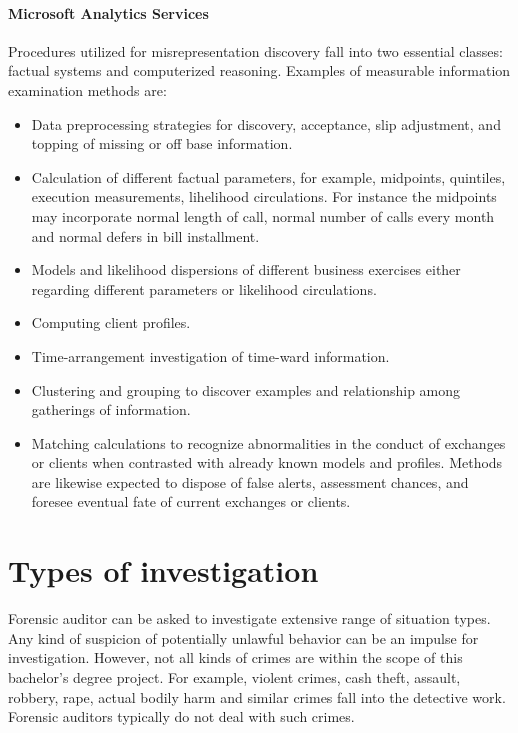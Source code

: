 {\paragraph{Microsoft Analytics Services}
Procedures utilized for misrepresentation discovery fall into two essential classes: factual systems and computerized reasoning. Examples of measurable information examination methods are: 

\begin{itemize}
\item Data preprocessing strategies for discovery, acceptance, slip adjustment, and topping of missing or off base information.
\item Calculation of different factual parameters, for example, midpoints, quintiles, execution measurements, lihelihood circulations. For instance the midpoints may incorporate normal length of call, normal number of calls every month and normal defers in bill installment.
\item Models and likelihood dispersions of different business exercises either regarding different parameters or likelihood circulations.
\item Computing client profiles.
\item Time-arrangement investigation of time-ward information.
\item Clustering and grouping to discover examples and relationship among gatherings of information.
\item Matching calculations to recognize abnormalities in the conduct of exchanges or clients when contrasted with already known models and profiles. Methods are likewise expected to dispose of false alerts, assessment chances, and foresee eventual fate of current exchanges or clients. %
\end{itemize}


}



\section{Types of investigation}

Forensic auditor can be asked to investigate extensive range of situation types. Any kind of suspicion of potentially unlawful behavior can be an impulse for investigation. However, not all kinds of crimes are within the scope of this bachelor's degree project. For example, violent crimes, cash theft, assault, robbery, rape, actual bodily harm and similar crimes fall into the detective work. Forensic auditors typically do not deal with such crimes. 

